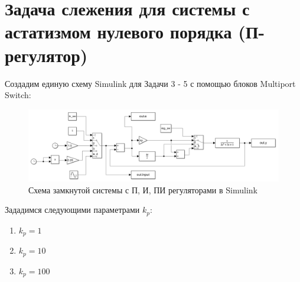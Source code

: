 \chapter{Задача слежения для системы с астатизмом нулевого порядка (П-регулятор)}
Создадим единую схему Simulink для Задачи 3 - 5 с помощью блоков Multiport Switch:
\begin{figure}[H]
    \centering
    \includegraphics[width=1\textwidth, trim={1cm 0cm 1cm 0cm}]{../images/sim4.png}
    \caption{Схема замкнутой системы с П, И, ПИ регуляторами в Simulink}
    \label{fig:sim4}
\end{figure}

Зададимся следующими параметрами $k_p$:
\begin{enumerate}
    \item $k_p = 1$
    \item $k_p = 10$ 
    \item $k_p = 100$
\end{enumerate}
\newpage
